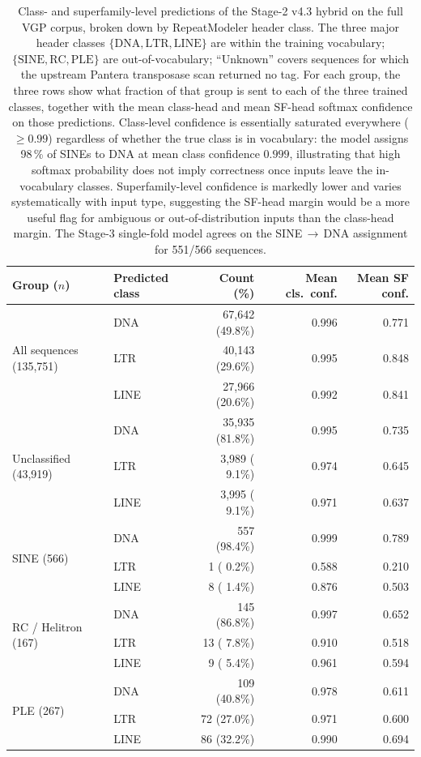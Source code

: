 \documentclass[12pt]{article}
\begin{document}
\begin{table}[h]
\centering
\caption{Class- and superfamily-level predictions of the Stage-2 v4.3 hybrid on the full VGP corpus, broken down by RepeatModeler header class. The three major header classes $\{\text{DNA},\text{LTR},\text{LINE}\}$ are within the training vocabulary; $\{\text{SINE},\text{RC},\text{PLE}\}$ are out-of-vocabulary; ``Unknown'' covers sequences for which the upstream Pantera transposase scan returned no tag. For each group, the three rows show what fraction of that group is sent to each of the three trained classes, together with the mean class-head and mean SF-head softmax confidence on those predictions. Class-level confidence is essentially saturated everywhere ($\geq 0.99$) regardless of whether the true class is in vocabulary: the model assigns 98\,\% of SINEs to DNA at mean class confidence $0.999$, illustrating that high softmax probability does not imply correctness once inputs leave the in-vocabulary classes. Superfamily-level confidence is markedly lower and varies systematically with input type, suggesting the SF-head margin would be a more useful flag for ambiguous or out-of-distribution inputs than the class-head margin. The Stage-3 single-fold model agrees on the SINE\,$\rightarrow$\,DNA assignment for 551/566 sequences.}
\label{tab:full_corpus_ood}
\small
\begin{tabular}{ll r r r}
\toprule
Group ($n$) & Predicted class & Count (\%) & Mean cls.\ conf. & Mean SF conf. \\
\midrule
\multirow{3}{*}{All sequences (135{,}751)}
  & DNA  & 67{,}642 (49.8\%) & 0.996 & 0.771 \\
  & LTR  & 40{,}143 (29.6\%) & 0.995 & 0.848 \\
  & LINE & 27{,}966 (20.6\%) & 0.992 & 0.841 \\
\midrule
\multirow{3}{*}{Unclassified (43{,}919)}
  & DNA  & 35{,}935 (81.8\%) & 0.995 & 0.735 \\
  & LTR  &  3{,}989 ( 9.1\%) & 0.974 & 0.645 \\
  & LINE &  3{,}995 ( 9.1\%) & 0.971 & 0.637 \\
\midrule
\multirow{3}{*}{SINE (566)}
  & DNA  & 557 (98.4\%) & 0.999 & 0.789 \\
  & LTR  &   1 ( 0.2\%) & 0.588 & 0.210 \\
  & LINE &   8 ( 1.4\%) & 0.876 & 0.503 \\
\midrule
\multirow{3}{*}{RC / Helitron (167)}
  & DNA  & 145 (86.8\%) & 0.997 & 0.652 \\
  & LTR  &  13 ( 7.8\%) & 0.910 & 0.518 \\
  & LINE &   9 ( 5.4\%) & 0.961 & 0.594 \\
\midrule
\multirow{3}{*}{PLE (267)}
  & DNA  & 109 (40.8\%) & 0.978 & 0.611 \\
  & LTR  &  72 (27.0\%) & 0.971 & 0.600 \\
  & LINE &  86 (32.2\%) & 0.990 & 0.694 \\
\bottomrule
\end{tabular}
\end{table}
\end{document}
